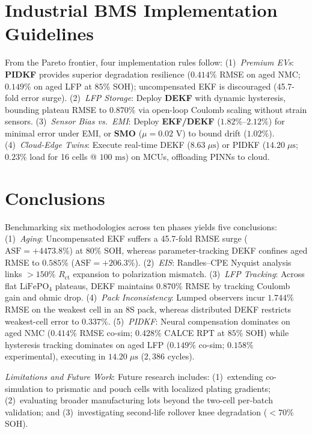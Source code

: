 \documentclass[balance,nocopyright,upint,varvw,hyphenate,barcolor=NavyBlue,nolists]{asmejour}
\begin{document}
\section{Industrial BMS Implementation Guidelines}
From the Pareto frontier, four implementation rules follow: (1)~\emph{Premium EVs}: \textbf{PIDKF} provides superior degradation resilience ($0.414\%$ RMSE on aged NMC; $0.149\%$ on aged LFP at $85\%$ SOH); uncompensated EKF is discouraged (45.7-fold error surge). (2)~\emph{LFP Storage}: Deploy \textbf{DEKF} with dynamic hysteresis, bounding plateau RMSE to $0.870\%$ via open-loop Coulomb scaling without strain sensors. (3)~\emph{Sensor Bias vs.\ EMI}: Deploy \textbf{EKF/DEKF} ($1.82\%\text{--}2.12\%$) for minimal error under EMI, or \textbf{SMO} ($\mu = 0.02\text{ V}$) to bound drift ($1.02\%$). (4)~\emph{Cloud-Edge Twins}: Execute real-time DEKF ($8.63\;\mu\text{s}$) or PIDKF ($14.20\;\mu\text{s}$; $0.23\%$ load for 16 cells @ $100\text{ ms}$) on MCUs, offloading PINNs to cloud.

\section{Conclusions}
Benchmarking six methodologies across ten phases yields five conclusions: 
(1)~\emph{Aging}: Uncompensated EKF suffers a 45.7-fold RMSE surge ($\text{ASF} = +4473.8\%$) at $80\%$ SOH, whereas parameter-tracking DEKF confines aged RMSE to $0.585\%$ ($\text{ASF} = +206.3\%$). 
(2)~\emph{EIS}: Randles--CPE Nyquist analysis links $>150\%$ $R_{\text{ct}}$ expansion to polarization mismatch. 
(3)~\emph{LFP Tracking}: Across flat $\text{LiFePO}_4$ plateaus, DEKF maintains $0.870\%$ RMSE by tracking Coulomb gain and ohmic drop. 
(4)~\emph{Pack Inconsistency}: Lumped observers incur $1.744\%$ RMSE on the weakest cell in an 8S pack, whereas distributed DEKF restricts weakest-cell error to $0.337\%$. 
(5)~\emph{PIDKF}: Neural compensation dominates on aged NMC ($0.414\%$ RMSE co-sim; $0.428\%$ CALCE RPT at $85\%$ SOH) while hysteresis tracking dominates on aged LFP ($0.149\%$ co-sim; $0.158\%$ experimental), executing in $14.20\;\mu\text{s}$ ($2,386$ cycles).

\par\smallskip\noindent\emph{Limitations and Future Work}: Future research includes: (1)~extending co-simulation to prismatic and pouch cells with localized plating gradients; (2)~evaluating broader manufacturing lots beyond the two-cell per-batch validation; and (3)~investigating second-life rollover knee degradation ($<70\%$ SOH).
\end{document}
